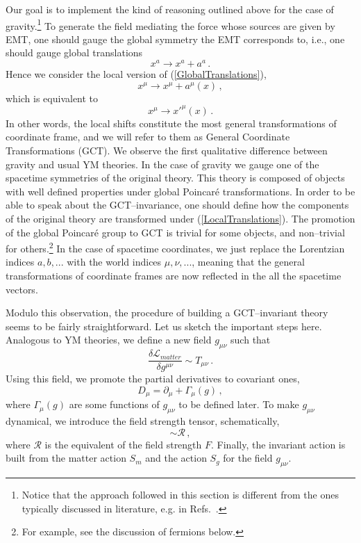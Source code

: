 \documentclass[11pt,a4paper]{article}
\begin{document}
Our goal is to implement the kind of reasoning outlined above for the case of gravity.\footnote{Notice that the approach followed in this section is different from the ones typically discussed in literature, e.g. in
Refs.~\cite{Utiyama:1956sy,Kibble:1961ba,Ortin:2004ms}.}
To generate the field mediating the force whose sources are given by EMT, one should gauge the global symmetry the EMT corresponds to, i.e., one should gauge global translations
\begin{equation}\label{GlobalTranslations}
x^a\rightarrow x^a+a^a \,.
\end{equation}
Hence we consider the local version of (\ref{GlobalTranslations}),
\begin{equation}\label{LocalTranslations}
x^\mu\rightarrow x^\mu+a^\mu(x) \,,
\end{equation}
which is equivalent to
\begin{equation}
x^\mu\rightarrow x'^\mu(x) \,.
\end{equation}
In other words, the local shifts constitute the most general transformations of coordinate frame, and we will refer to them as General Coordinate Transformations (GCT). We observe the first qualitative difference between gravity and usual YM theories. In the case of gravity we gauge one of the spacetime symmetries of the original theory. This theory is composed of objects with well defined properties under global Poincar\'e transformations. In order to be able to speak about the GCT--invariance, one should define how the components of the original theory are transformed under (\ref{LocalTranslations}). The promotion of the global Poincar\'e group to GCT is trivial for some objects, and non--trivial for others.\footnote{For example, see the discussion of fermions below.}
In the case of spacetime coordinates, we just replace the Lorentzian indices $a,b,...$ with the world indices $\mu,\nu,...$, meaning that the general transformations of coordinate frames are now reflected in the all the spacetime vectors.

Modulo this observation, the procedure of building a GCT--invariant theory seems to be fairly straightforward. Let us sketch the important steps here. Analogous to YM theories, we define a new field $g_{\mu\nu}$ such that
\begin{equation}\label{TetradDef}
\dfrac{\delta\mathcal{L}_{matter}}{\delta g^{\mu\nu}}\sim T_{\mu\nu} \,.
\end{equation}
Using this field, we promote the partial derivatives to covariant ones,
\begin{equation}
D_\mu = \partial_\mu + \Gamma_\mu(g) \,,
\end{equation}
where $\Gamma_\mu(g)$ are some functions of $g_{\mu\nu}$ to be defined later. To make $g_{\mu\nu}$ dynamical, we introduce the field strength tensor, schematically,
\begin{equation}
[D,D]\sim \mathcal{R} \,,
\end{equation}
where $\mathcal{R}$ is the equivalent of the field strength $F$. Finally, the invariant action is built from the matter action $S_m$ and the action $S_g$ for the field $g_{\mu\nu}$.
\end{document}
